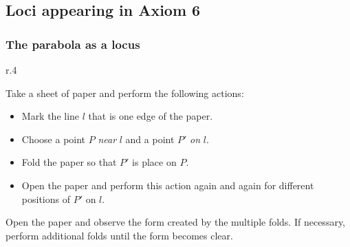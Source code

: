 
\subsection{Loci appearing in Axiom 6}

\subsubsection{The parabola as a locus}

\begin{wrapfigure}[2]{r}{.4\textwidth}
\begin{center}
\vspace{-6ex}
\end{center}
\end{wrapfigure}
Take a sheet of paper and perform the following actions:
\begin{itemize}
\item Mark the line $l$ that is one edge of the paper.
\item Choose a point $P$ \emph{near} $l$ and a point $P'$ \emph{on} $l$.
\item Fold the paper so that $P'$ is place on $P$.
\item Open the paper and perform this action again and again for different positions of $P'$ on $l$.
\end{itemize}
Open the paper and observe the form created by the multiple folds. If necessary, perform additional folds until the form becomes clear.
